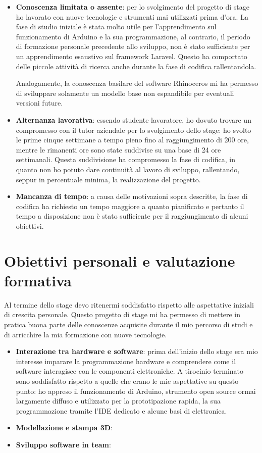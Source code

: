 \begin{itemize}
\item \textbf{Conoscenza limitata o assente}: per lo svolgimento del progetto di stage ho lavorato con nuove tecnologie e strumenti mai utilizzati prima d'ora. La fase di studio iniziale è stata molto utile per l'apprendimento sul funzionamento di Arduino e la sua programmazione, al contrario, il periodo di formazione personale precedente allo sviluppo, non è stato sufficiente per un apprendimento esaustivo sul framework Laravel. Questo ha comportato delle piccole attività di ricerca anche durante la fase di codifica rallentandola.

Analogamente, la conoscenza basilare del software Rhinoceros mi ha permesso di sviluppare solamente un modello base non espandibile per eventuali versioni future.
\item \textbf{Alternanza lavorativa}: essendo studente lavoratore, ho dovuto trovare un compromesso con il tutor aziendale per lo svolgimento dello stage: ho svolto le prime cinque settimane a tempo pieno fino al raggiungimento di 200 ore, mentre le rimanenti ore sono state suddivise su una base di 24 ore settimanali. Questa suddivisione ha compromesso la fase di codifica, in quanto non ho potuto dare continuità al lavoro di sviluppo, rallentando, seppur in percentuale minima, la realizzazione del progetto.
\item \textbf{Mancanza di tempo}: a causa delle motivazioni sopra descritte, la fase di codifica ha richiesto un tempo maggiore a quanto pianificato e pertanto il tempo a disposizione non è stato sufficiente per il raggiungimento di alcuni obiettivi.
\end{itemize}

\section{Obiettivi personali e valutazione formativa}
Al termine dello stage devo ritenermi soddisfatto rispetto alle aspettative iniziali di crescita personale. Questo progetto di stage mi ha permesso di mettere in pratica buona parte delle conoscenze acquisite durante il mio percorso di studi e di arricchire la mia formazione con nuove tecnologie.

\begin{itemize}
\item \textbf{Interazione tra hardware e software}: prima dell'inizio dello stage era mio interesse imparare la programmazione hardware e comprendere come il software interagisce con le componenti elettroniche. A tirocinio terminato sono soddisfatto rispetto a quelle che erano le mie aspettative su questo punto: ho appreso il funzionamento di Arduino, strumento open source ormai largamente diffuso e utilizzato per la prototipazione rapida, la sua programmazione tramite l'IDE dedicato e alcune basi di elettronica.
\item \textbf{Modellazione e stampa 3D}:
\item \textbf{Sviluppo software in team}:
\end{itemize}

